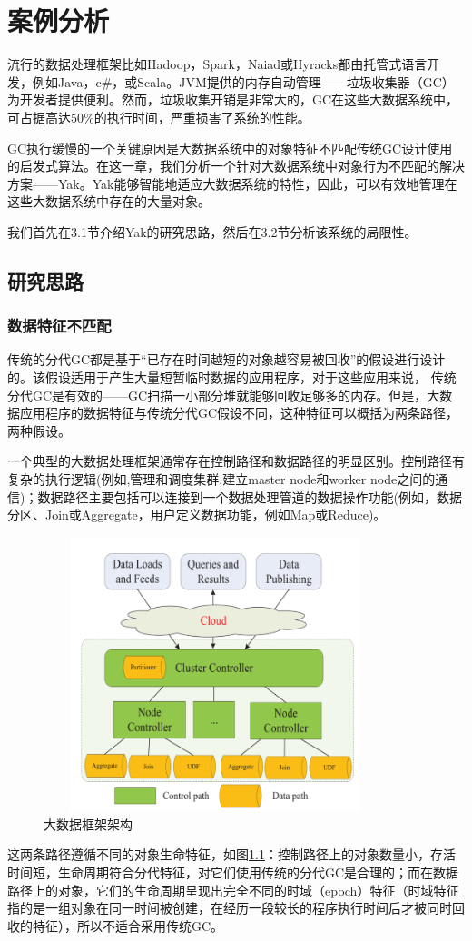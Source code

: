 
\chapter{案例分析}
流行的数据处理框架比如Hadoop，Spark，Naiad或Hyracks都由托管式语言开发，例如Java，c\#，或Scala。JVM提供的内存自动管理——垃圾收集器（GC）为开发者提供便利。然而，垃圾收集开销是非常大的，GC在这些大数据系统中，可占据高达50\%的执行时间，严重损害了系统的性能。

GC执行缓慢的一个关键原因是大数据系统中的对象特征不匹配传统GC设计使用的启发式算法。在这一章，我们分析一个针对大数据系统中对象行为不匹配的解决方案——Yak。Yak能够智能地适应大数据系统的特性，因此，可以有效地管理在这些大数据系统中存在的大量对象。

我们首先在3.1节介绍Yak的研究思路，然后在3.2节分析该系统的局限性。


\section{研究思路}
\subsection{数据特征不匹配}

传统的分代GC都是基于“已存在时间越短的对象越容易被回收”的假设进行设计的。该假设适用于产生大量短暂临时数据的应用程序，对于这些应用来说， 传统分代GC是有效的——GC扫描一小部分堆就能够回收足够多的内存。但是，大数据应用程序的数据特征与传统分代GC假设不同，这种特征可以概括为两条路径，两种假设。

一个典型的大数据处理框架通常存在控制路径和数据路径的明显区别。控制路径有复杂的执行逻辑(例如,管理和调度集群,建立master node和worker node之间的通信)；数据路径主要包括可以连接到一个数据处理管道的数据操作功能(例如，数据分区、Join或Aggregate，用户定义数据功能，例如Map或Reduce)。
\begin{figure}[h]
    \centering
    \includegraphics[width=10cm,height=8cm]{figure/two_Path.png}
    \caption{大数据框架架构}
    \label{img1}
\end{figure}
这两条路径遵循不同的对象生命特征，如图\ref{img1}：控制路径上的对象数量小，存活时间短，生命周期符合分代特征，对它们使用传统的分代GC是合理的；而在数据路径上的对象，它们的生命周期呈现出完全不同的时域（epoch）特征（时域特征指的是一组对象在同一时间被创建，在经历一段较长的程序执行时间后才被同时回收的特征），所以不适合采用传统GC。


